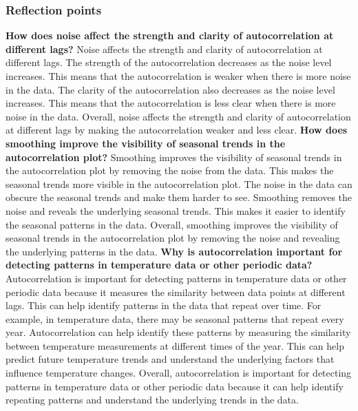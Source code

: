\documentclass[a4paper,12pt]{article} %
\begin{document}
\subsubsection{Reflection points}
\textbf{How does noise affect the strength and clarity of autocorrelation at different lags?}
Noise affects the strength and clarity of autocorrelation at different lags. The strength of the autocorrelation decreases as the noise level increases. This means that the autocorrelation is weaker when there is more noise in the data. The clarity of the autocorrelation also decreases as the noise level increases. This means that the autocorrelation is less clear when there is more noise in the data. Overall, noise affects the strength and clarity of autocorrelation at different lags by making the autocorrelation weaker and less clear.  
\newline\newline
\textbf{How does smoothing improve the visibility of seasonal trends in the autocorrelation
plot?}
Smoothing improves the visibility of seasonal trends in the autocorrelation plot by removing the noise from the data. This makes the seasonal trends more visible in the autocorrelation plot. The noise in the data can obscure the seasonal trends and make them harder to see. Smoothing removes the noise and reveals the underlying seasonal trends. This makes it easier to identify the seasonal patterns in the data. Overall, smoothing improves the visibility of seasonal trends in the autocorrelation plot by removing the noise and revealing the underlying patterns in the data.
\newline\newline
\textbf{Why is autocorrelation important for detecting patterns in temperature data or
other periodic data?}
Autocorrelation is important for detecting patterns in temperature data or other periodic data because it measures the similarity between data points at different lags. This can help identify patterns in the data that repeat over time. For example, in temperature data, there may be seasonal patterns that repeat every year. Autocorrelation can help identify these patterns by measuring the similarity between temperature measurements at different times of the year. This can help predict future temperature trends and understand the underlying factors that influence temperature changes. Overall, autocorrelation is important for detecting patterns in temperature data or other periodic data because it can help identify repeating patterns and understand the underlying trends in the data.
\end{document}
